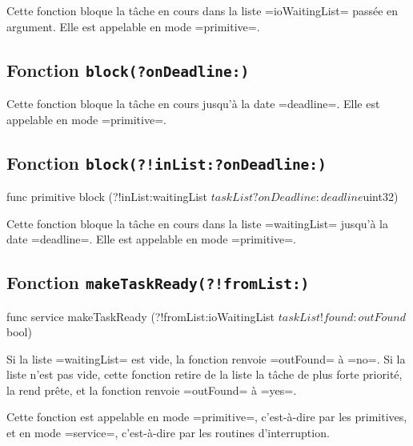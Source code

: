 Cette fonction bloque la tâche en cours dans la liste \plm=ioWaitingList= passée en argument. Elle est appelable en mode \plm=primitive=.




\subsection{Fonction \texttt{block(?onDeadline{}:)}}


Cette fonction bloque la tâche en cours jusqu'à la date \plm=deadline=. Elle est appelable en mode \plm=primitive=.







\subsection{Fonction \texttt{block(?!inList{}:?onDeadline{}:)}}

\begin{PLM}
func primitive block (?!inList:waitingList $taskList 
                      ?onDeadline:deadline $uint32) 
\end{PLM}

Cette fonction bloque la tâche en cours dans la liste \plm=waitingList= jusqu'à la date \plm=deadline=. Elle est appelable en mode \plm=primitive=.








\subsection{Fonction \texttt{makeTaskReady(?!fromList{}:)}}

\begin{PLM}
func service
makeTaskReady (?!fromList:ioWaitingList $taskList
               !found: outFound $bool)
\end{PLM}

Si la liste \plm=waitingList= est vide, la fonction renvoie \plm=outFound= à \plm=no=. Si la liste n'est pas vide, cette fonction retire de la liste la tâche de plus forte priorité, la rend prête, et la fonction renvoie \plm=outFound= à \plm=yes=.

Cette fonction est appelable en mode \plm=primitive=, c'est-à-dire par les primitives, et en mode \plm=service=, c'est-à-dire par les routines d'interruption.










